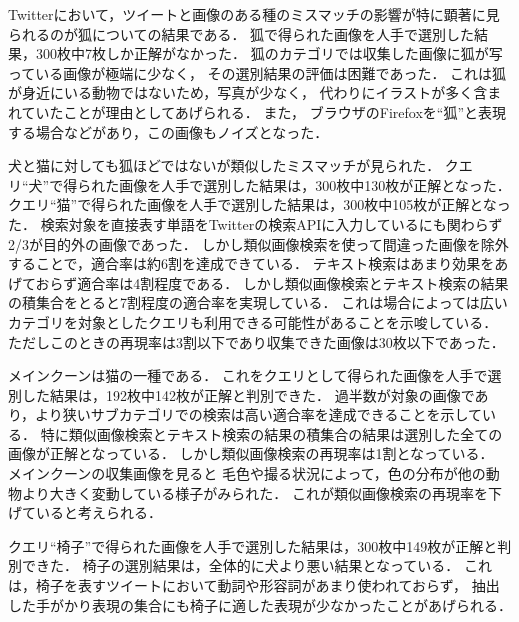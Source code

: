 \documentclass{deimj}
\begin{document}
Twitterにおいて，ツイートと画像のある種のミスマッチの影響が特に顕著に見られるのが狐についての結果である．
狐で得られた画像を人手で選別した結果，300枚中7枚しか正解がなかった．
狐のカテゴリでは収集した画像に狐が写っている画像が極端に少なく，
その選別結果の評価は困難であった．
これは狐が身近にいる動物ではないため，写真が少なく，
代わりにイラストが多く含まれていたことが理由としてあげられる．
また，
ブラウザのFirefoxを“狐”と表現する場合などがあり，この画像もノイズとなった．

犬と猫に対しても狐ほどではないが類似したミスマッチが見られた．
クエリ“犬”で得られた画像を人手で選別した結果は，300枚中130枚が正解となった．
クエリ“猫”で得られた画像を人手で選別した結果は，300枚中105枚が正解となった．
検索対象を直接表す単語をTwitterの検索APIに入力しているにも関わらず2/3が目的外の画像であった．
しかし類似画像検索を使って間違った画像を除外することで，適合率は約6割を達成できている．
テキスト検索はあまり効果をあげておらず適合率は4割程度である．
しかし類似画像検索とテキスト検索の結果の積集合をとると7割程度の適合率を実現している．
これは場合によっては広いカテゴリを対象としたクエリも利用できる可能性があることを示唆している．
ただしこのときの再現率は3割以下であり収集できた画像は30枚以下であった．

メインクーンは猫の一種である．
これをクエリとして得られた画像を人手で選別した結果は，192枚中142枚が正解と判別できた．
過半数が対象の画像であり，より狭いサブカテゴリでの検索は高い適合率を達成できることを示している．
特に類似画像検索とテキスト検索の結果の積集合の結果は選別した全ての画像が正解となっている．
しかし類似画像検索の再現率は1割となっている．
メインクーンの収集画像を見ると
毛色や撮る状況によって，色の分布が他の動物より大きく変動している様子がみられた．
これが類似画像検索の再現率を下げていると考えられる．


クエリ“椅子”で得られた画像を人手で選別した結果は，300枚中149枚が正解と判別できた．
椅子の選別結果は，全体的に犬より悪い結果となっている．
これは，椅子を表すツイートにおいて動詞や形容詞があまり使われておらず，
抽出した手がかり表現の集合にも椅子に適した表現が少なかったことがあげられる．
\end{document}
